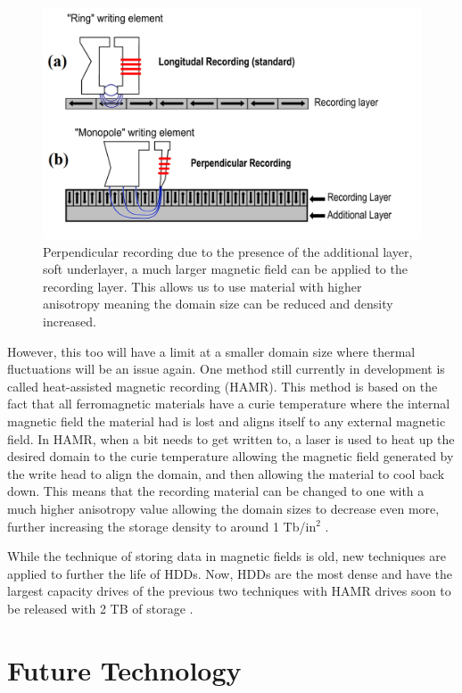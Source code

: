 \documentclass[ notitlepage, numerical, 11pt]{revtex4-1} %
\begin{document}
\begin{figure}[H]
\centerline{\includegraphics[scale=.45]{perpendicularComparison.png}}
\caption{Perpendicular recording due to the presence of the additional layer, soft underlayer, a much larger magnetic field can be applied to the recording layer. This allows us to use material with higher anisotropy meaning the domain size can be reduced and density increased.}
\label{perpendicularComparison}
\end{figure}


However, this too will have a limit at a smaller domain size where thermal fluctuations will be an issue again. One method still currently in development is called heat-assisted magnetic recording (HAMR). This method is based on the fact that all ferromagnetic materials have a curie temperature where the internal magnetic field the material had is lost and aligns itself to any external magnetic field. In HAMR, when a bit needs to get written to, a laser is used to heat up the desired domain to the curie temperature allowing the magnetic field generated by the write head to align the domain, and then allowing the material to cool back down. This means that the recording material can be changed to one with a much higher anisotropy value allowing the domain sizes to decrease even more, further increasing the storage density to around 1 Tb/in$^2$ \cite{hamr}. 

While the technique of storing data in magnetic fields is old, new techniques are applied to further the life of HDDs. Now, HDDs are the most dense and have the largest capacity drives of the previous two techniques with HAMR drives soon to be released with 2 TB of storage \cite{seagate}.


\section{Future Technology}
\end{document}
